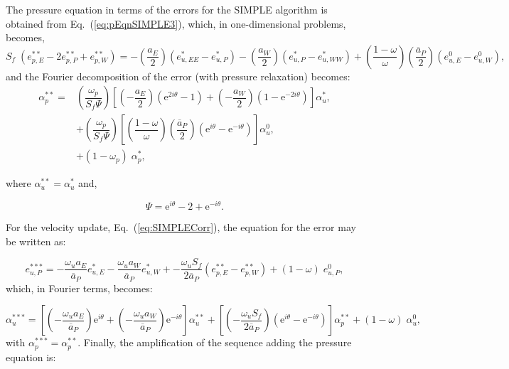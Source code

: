 \documentclass[final,3p,times,11pt,onecolumn]{myElsarticle}
\numberwithin{equation}{section}
\begin{document}
The pressure equation in terms of the errors for the SIMPLE algorithm is obtained from Eq.~(\ref{eq:pEqnSIMPLE3}), which, in one-dimensional problems, becomes,
\begin{equation}
    S_f \; (e_{p,E}^{**} - 2 e_{p,P}^{**} + e_{p,W}^{**}) = 
     -\left(\dfrac{a_E}{2}\right) (e_{u,EE}^* - e_{u,P}^*) 
    -\left(\dfrac{a_W}{2}\right) (e_{u,P}^* - e_{u,WW}^*)  +
    \left( \dfrac{1-\omega}{\omega} \right) \left(\dfrac{\overline{a}_P}{2}\right) (e_{u,E}^0 - e_{u,W}^0),
\end{equation}
and the Fourier decomposition of the error (with pressure relaxation) becomes:
\begin{equation}
\begin{split}
    \alpha_p^{**} = &\left( \dfrac{\omega_p}{S_f \Psi} \right) 
                    \left[ \left(-\dfrac{a_E}{2} \right) \left(\text{e}^{2 i \theta} - 1 \right) +
                            \left(-\dfrac{a_W}{2} \right) \left(1 - \text{e}^{-2 i \theta}\right)
                    \right] \alpha_u^{*}, \\
                    & + \left( \dfrac{\omega_p}{S_f \Psi} \right) 
                    \left[ \left(\dfrac{1-\omega}{\omega} \right) \left(\dfrac{\overline{a}_P}{2} \right) \left(\text{e}^{i \theta} - \text{e}^{- i \theta} \right) 
                    \right] \alpha_u^{0}, \\
                    & + (1-\omega_p) \; \alpha_p^*,   
\end{split}
\end{equation}

\noindent where $\alpha_u^{**} = \alpha_u^{*}$ and,

\begin{equation}
    \Psi = \text{e}^{i \theta} - 2 + \text{e}^{- i \theta}.
\end{equation}

For the velocity update, Eq.~(\ref{eq:SIMPLECorr}), the equation for the error may be written as:

\begin{equation}
    e_{u,P}^{***} = -\dfrac{\omega_u a_E}{\overline{a}_P} e_{u,E}^{*} -\dfrac{\omega_u a_W}{\overline{a}_P} e_{u,W}^{*} +
                   -\dfrac{\omega_u S_f}{2 \overline{a}_P} (e_{p,E}^{**}-e_{p,W}^{**}) +
                   (1-\omega) \; e_{u,P}^0,
\end{equation}
which, in Fourier terms, becomes:

\begin{equation}
    \alpha_{u}^{***} = \left[\left(-\dfrac{\omega_u a_E}{\overline{a}_P}\right) \text{e}^{i \theta} + \left(- \dfrac{\omega_u a_W}{\overline{a}_P}\right) \text{e}^{- i \theta}\right] \alpha_u^{**} +
                   \left[\left(-\dfrac{\omega_u S_f}{2 \overline{a}_P}\right) \left(\text{e}^{i \theta}-\text{e}^{-i \theta}\right) \right] \alpha_p^{**} +
                   (1-\omega) \; \alpha_u^0,
\end{equation}
with $\alpha_p^{***}=\alpha_p^{**}$.
Finally, the amplification of the sequence adding the pressure equation is:
\end{document}
